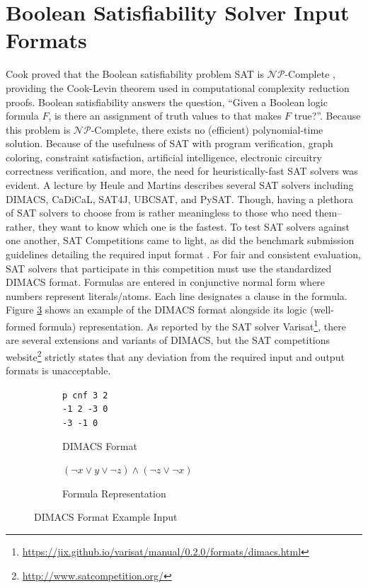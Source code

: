 \documentclass[ms]{uncgdissertationexp2}
\theoremstyle{plain}
\theoremstyle{definition}
\theoremstyle{remark}
\begin{document}
\section{Boolean Satisfiability Solver Input Formats} 
Cook proved that the Boolean satisfiability problem SAT is $\mathcal{NP}$-Complete \cite{cook}, providing the Cook-Levin theorem used in computational complexity reduction proofs. Boolean satisfiability answers the question, ``Given a Boolean logic formula $F$, is there an assignment of truth values to that makes $F$ true?''. Because this problem is $\mathcal{NP}$-Complete, there exists no (efficient) polynomial-time solution. Because of the usefulness of SAT with program verification, graph coloring, constraint satisfaction, artificial intelligence, electronic circuitry correctness verification, and more, the need for heuristically-fast SAT solvers was evident. A lecture by Heule and Martins \cite{satsolvers} describes several SAT solvers including DIMACS, CaDiCaL, SAT4J, UBCSAT, and PySAT. Though, having a plethora of SAT solvers to choose from is rather meaningless to those who need them--rather, they want to know which one is the fastest. To test SAT solvers against one another, SAT Competitions came to light, as did the benchmark submission guidelines detailing the required input format \cite{satbenchmark}. For fair and consistent evaluation, SAT solvers that participate in this competition must use the standardized DIMACS format. Formulas are entered in conjunctive normal form where numbers represent literals/atoms. Each line designates a clause in the formula. Figure \ref{fig:dimacsexample} shows an example of the DIMACS format alongside its logic (well-formed formula) representation. As reported by the SAT solver Varisat\footnote{\url{https://jix.github.io/varisat/manual/0.2.0/formats/dimacs.html}}, there are several extensions and variants of DIMACS, but the SAT competitions website\footnote{\url{http://www.satcompetition.org/}} strictly states that any deviation from the required input and output formats is unacceptable. 
\begin{figure}[!ht]
	\centering
	\begin{subfigure}{.5\textwidth}
		\centering
		\texttt{p cnf 3 2}\\
		\texttt{-1 2 -3 0}\\
		\texttt{-3 -1 0}
		\caption{DIMACS Format}
		\label{fig:dimacs}
	\end{subfigure}%
	\begin{subfigure}{.5\textwidth}
		\centering
		$(\lnot{x} \lor y \lor \lnot{z}) \land (\lnot{z} \lor \lnot{x})$
		\caption{Formula Representation}
		\label{fig:satformat}
	\end{subfigure}
	\caption{DIMACS Format Example Input}
	\label{fig:dimacsexample}
\end{figure}  
\end{document}
